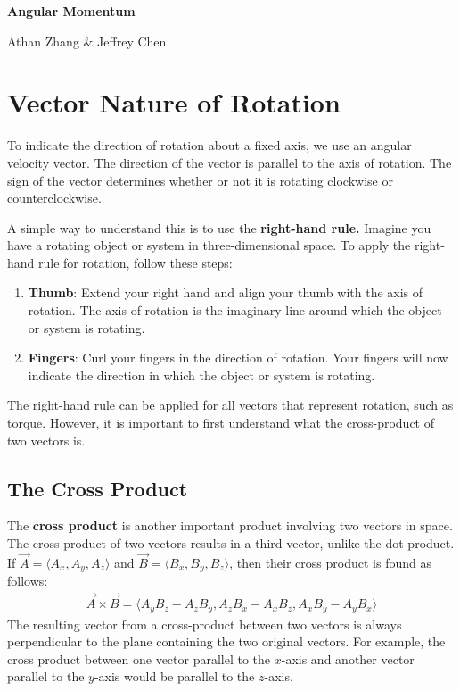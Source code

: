 \documentclass[11pt]{article}
\begin{document}
\textbf{\Huge Angular Momentum}

Athan Zhang \& Jeffrey Chen

\section{Vector Nature of Rotation}

To indicate the direction of rotation about a fixed axis, we use an angular velocity vector. The direction of the vector is parallel to the axis of rotation. The sign of the vector determines whether or not it is rotating clockwise or counterclockwise. 

A simple way to understand this is to use the \textbf{right-hand rule.} Imagine you have a rotating object or system in three-dimensional space. To apply the right-hand rule for rotation, follow these steps:

\begin{enumerate}
  \item \textbf{Thumb}: Extend your right hand and align your thumb with the axis of rotation. The axis of rotation is the imaginary line around which the object or system is rotating.

  \item \textbf{Fingers}: Curl your fingers in the direction of rotation. Your fingers will now indicate the direction in which the object or system is rotating.
\end{enumerate}

The right-hand rule can be applied for all vectors that represent rotation, such as torque. However, it is important to first understand what the cross-product of two vectors is.

\subsection{The Cross Product}
The \textbf{cross product} is another important product involving two vectors in space. The cross product of two vectors results in a third vector, unlike the dot product. If $\Vec{A} = \langle A_x, A_y, A_z\rangle$ and $\Vec{B} = \langle B_x, B_y, B_z\rangle$, then their cross product is found as follows:
\begin{align*}
    \Vec{A} \times \Vec{B} = \langle A_yB_z - A_zB_y, A_zB_x - A_xB_z, A_xB_y - A_yB_x \rangle
\end{align*}
The resulting vector from a cross-product between two vectors is always perpendicular to the plane containing the two original vectors. For example, the cross product between one vector parallel to the $x$-axis and another vector parallel to the $y$-axis would be parallel to the $z$-axis.
\end{document}
